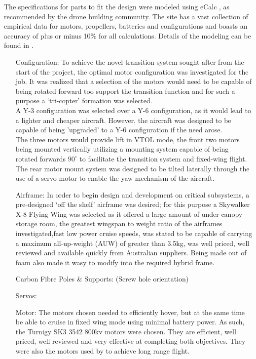 The specifications for parts to fit the design were modeled using eCalc , as recommended by the drone building community. The site has a vast collection of empirical data for motors, propellers, batteries and configurations and boasts an accuracy of plus or minus 10\% for all calculations. Details of the modeling can be found in .
	 \begin{itemize}
		\item[Configuration:] 	To achieve the novel transition system sought after from the start of the project, the optimal motor configuration was investigated for the job. It was realized that a selection of the motors would need to be capable of being rotated forward too support the transition function and for such a purpose a `tri-copter' formation was selected.\\
		A Y-3 configuration was selected over a Y-6 configuration, as it would lead to a lighter and cheaper aircraft. However, the aircraft was designed to be capable of being 'upgraded' to a Y-6 configuration if the need arose.\\
		The three motors would provide lift in VTOL mode, the front two motors being mounted vertically utilizing a mounting system capable of being rotated forwards $90^{\circ}$ to facilitate the transition system and fixed-wing flight. The rear motor mount system was designed to be tilted laterally through the use of a servo-motor to enable the yaw mechanism of the aircraft.\\
	
		\item[Airframe:] 	In order to begin design and development on critical subsystems, a pre-designed `off the shelf' airframe was desired; for this purpose a Skywalker X-8 Flying Wing was selected as it offered a large amount of under canopy storage room, the greatest wingspan to weight ratio of the airframes investigated,fast low power cruise speeds, was stated to be capable of carrying a maximum all-up-weight (AUW) of greater than 3.5kg, was  well priced, well reviewed and available quickly from Australian suppliers. Being made out of foam also made it wasy to modify into the required hybrid frame.
		
		\item[Carbon Fibre Poles \& Supports:] (Screw hole orientation)
		
		\item[Servos:]
	
		\item[Motor:] The motors chosen needed to efficiently hover, but at the same time be able to cruise in fixed wing mode using minimal battery power. As such, the Turnigy SK3 3542 800kv motors were chosen. They are efficient, well priced, well reviewed and very effective at completing both objectives. They were also the motors used by  to achieve long range flight.
	

\end{itemize}
